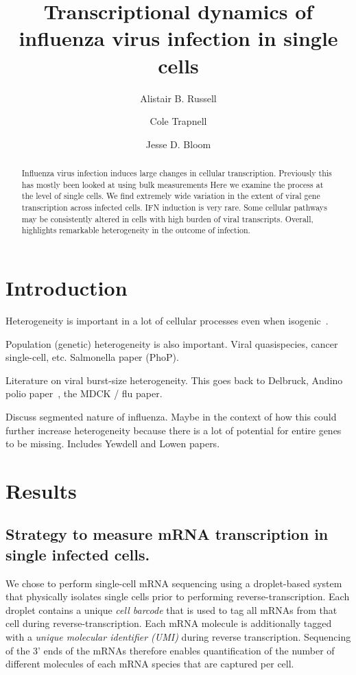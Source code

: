 \documentclass[9pt,lineno]{elife}
\title{Transcriptional dynamics of influenza virus infection in single cells}
\author[1]{Alistair B. Russell}
\author[2]{Cole Trapnell}
\author[1,2*]{Jesse D. Bloom}
\affil[1]{Basic Sciences Division and Computational Biology Program, Fred Hutchinson Cancer Research Center, Seattle, United States}
\affil[2]{Department of Genome Sciences, University of Washington, Seattle, United States}
\begin{document}
\maketitle

\begin{abstract}
Influenza virus infection induces large changes in cellular transcription.
Previously this has mostly been looked at using bulk measurements
Here we examine the process at the level of single cells.
We find extremely wide variation in the extent of viral gene transcription across infected cells.
IFN induction is very rare.
Some cellular pathways may be consistently altered in cells with high burden of viral transcripts.
Overall, highlights remarkable heterogeneity in the outcome of infection.
\end{abstract}


\section{Introduction}

Heterogeneity is important in a lot of cellular processes even when isogenic~\citep{shalek2013single,shalek2014single}.

Population (genetic) heterogeneity is also important. 
Viral quasispecies, cancer single-cell, etc.
Salmonella paper (PhoP).

Literature on viral burst-size heterogeneity.
This goes back to Delbruck, Andino polio paper~\citep{schulte2014single}, the MDCK / flu paper.

Discuss segmented nature of influenza.
Maybe in the context of how this could further increase heterogeneity because there is a lot of potential for entire genes to be missing.
Includes Yewdell and Lowen papers.

\section{Results}

\subsection{Strategy to measure mRNA transcription in single infected cells.}
We chose to perform single-cell mRNA sequencing using a droplet-based system that physically isolates single cells prior to performing reverse-transcription.
Each droplet contains a unique \emph{cell barcode} that is used to tag all mRNAs from that cell during reverse-transcription.
Each mRNA molecule is additionally tagged with a \emph{unique molecular identifier (UMI)} during reverse transcription.
Sequencing of the 3' ends of the mRNAs therefore enables quantification of the number of different molecules of each mRNA species that are captured per cell.
\end{document}
